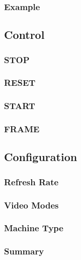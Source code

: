 \subsubsection{Example}
\subsection{Control}
\subsubsection{STOP}
\subsubsection{RESET}
\subsubsection{START}
\subsubsection{FRAME}
\subsection{Configuration}
\subsubsection{Refresh Rate}
\subsubsection{Video Modes}
\subsubsection{Machine Type}
\subsubsection{Summary}



